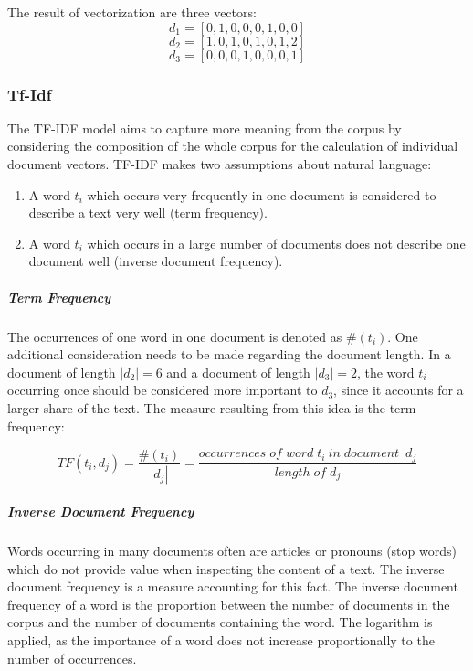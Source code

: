             The result of vectorization are three vectors:
            \[ d_{1} = [0,1,0,0,0,1,0,0] \]
            \[ d_{2} = [1,0,1,0,1,0,1,2] \]	
            \[ d_{3} = [0,0,0,1,0,0,0,1]\]
            
            \subsubsection{Tf-Idf}
            \label{section:tfidf}
            The \ac{TF-IDF} model aims to capture more meaning from the corpus by considering the composition of the whole corpus for the calculation of individual document vectors. \ac{TF-IDF} makes two assumptions about natural language:
            \begin{enumerate}
            	\item A word $t_{i} $ which occurs very frequently in one document is considered to describe a text very well (term frequency).
            	\item A word $t_{i} $ which occurs in a large number of documents does not describe one document well (inverse document frequency).
            \end{enumerate}
            
            \subparagraph{Term Frequency}
            The occurrences of one word in one document is denoted as $ \#( t_{i}) $.
            One additional consideration needs to be made regarding the document length. In a document of length $ |d_{2}| = 6 $ and a document of length  $ |d_{3}| = 2 $, the word $ t_{i} $occurring once should be considered more important to $ d_{3} $, since it accounts for a larger share of the text. The measure resulting from this idea is the term frequency:
            
            \[ TF(t_{i}, d_{j}) =   \dfrac{\#( t_{i})}{|d_{j}|} = \dfrac{occurrences \; of \; word \; t_{i} \: in \; document \;\:   d_{j}}{length \; of \; d_{j}} \]
            
            \subparagraph{Inverse Document Frequency}
            Words occurring in many documents often are articles or pronouns (stop words) which do not provide value when inspecting the content of a text. The inverse document frequency is a measure accounting for this fact. The inverse document frequency of a word is the proportion between the number of documents in the corpus and the number of documents containing the word. The logarithm is applied, as the importance of a word does not increase proportionally to the number of occurrences.
        
